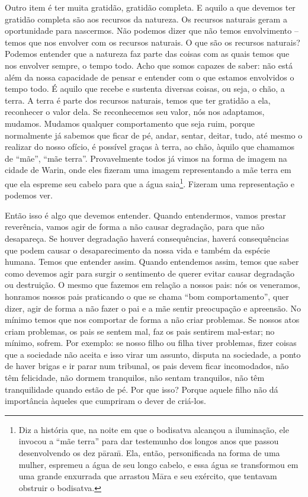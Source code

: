 Outro item é ter muita gratidão, gratidão completa. E aquilo a que
devemos ter gratidão completa são aos recursos da natureza. Os recursos
naturais geram a oportunidade para nascermos. Não podemos dizer que não
temos envolvimento – temos que nos envolver com os recursos naturais. O
que são os recursos naturais? Podemos entender que a natureza faz parte
das coisas com as quais temos que nos envolver sempre, o tempo todo.
Acho que somos capazes de saber: não está além da nossa capacidade de
pensar e entender com o que estamos envolvidos o tempo todo. É aquilo
que recebe e sustenta diversas coisas, ou seja, o chão, a terra. A
terra é parte dos recursos naturais, temos que ter gratidão a ela,
reconhecer o valor dela. Se reconhecemos seu valor, nós nos adaptamos,
mudamos. Mudamos qualquer comportamento que seja ruim, porque
normalmente já sabemos que ficar de pé, andar, sentar, deitar, tudo,
até mesmo o realizar do nosso ofício, é possível graças à terra, ao
chão, àquilo que chamamos de “mãe”, “mãe terra”. Provavelmente todos já
vimos na forma de imagem na cidade de Warin, onde eles fizeram uma
imagem representando a mãe terra em que ela espreme seu cabelo para que
a água saia\footnote{Diz a história que, na noite em que o bodisatva
alcançou a iluminação, ele invocou a “mãe terra” para dar testemunho
dos longos anos que passou desenvolvendo os dez p\=aram\=\is. Ela,
então, personificada na forma de uma mulher, espremeu a água de seu
longo cabelo, e essa água se transformou em uma grande enxurrada que
arrastou M\=ara e seu exército, que tentavam obstruir o bodisatva. }.
Fizeram uma representação e podemos ver. 

Então isso é algo que devemos entender. Quando entendermos, vamos
prestar reverência, vamos agir de forma a não causar degradação, para
que não desapareça. Se houver degradação haverá consequências, haverá
consequências que podem causar o desaparecimento da nossa vida e também
da espécie humana. Temos que entender assim. Quando entendemos assim,
temos que saber como devemos agir para surgir o sentimento de querer
evitar causar degradação ou destruição. O mesmo que fazemos em relação
a nossos pais: nós os veneramos, honramos nossos pais praticando o que
se chama “bom comportamento”, quer dizer, agir de forma a não fazer o
pai e a mãe sentir preocupação e apreensão. No mínimo temos que nos
comportar de forma a não criar problemas. Se nossos atos criam
problemas, os pais se sentem mal, faz os pais sentirem mal-estar; no
mínimo, sofrem. Por exemplo: se nosso filho ou filha tiver problemas,
fizer coisas que a sociedade não aceita e isso virar um assunto,
disputa na sociedade, a ponto de haver brigas e ir parar num tribunal,
os pais devem ficar incomodados, não têm felicidade, não dormem
tranquilos, não sentam tranquilos, não têm tranquilidade quando estão
de pé. Por que isso? Porque aquele filho não dá importância àqueles que
cumpriram o dever de criá-los. 

